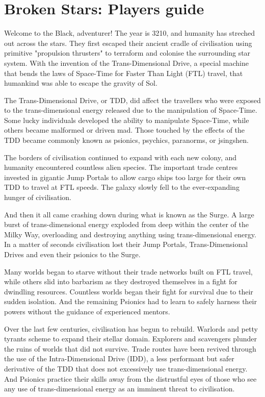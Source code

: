 \documentclass[10pt,twoside]{article}
\begin{document}
\section*{Broken Stars: Players guide}
\addtocounter{section}{1}

Welcome to the Black, adventurer! The year is 3210, and humanity has streched out across the stars. They first escaped their ancient cradle of civilisation using primitive "propulsion thrusters" to terraform and colonise the surrounding star system. With the invention of the Trans-Dimensional Drive, a special machine that bends the laws of Space-Time for Faster Than Light (FTL) travel, that humankind was able to escape the gravity of Sol.

The Trans-Dimensional Drive, or TDD, did affect the travellers who were exposed to the trans-dimensional energy released due to the manipulation of Space-Time. Some lucky individuals developed the ability to manipulate Space-Time, while others became malformed or driven mad. Those touched by the effects of the TDD became commonly known as psionics, psychics, paranorms, or jsingshen.

The borders of civilisation continued to expand with each new colony, and humanity encountered countless alien species. The important trade centres invested in gigantic Jump Portals to allow cargo ships too large for their own TDD to travel at FTL speeds. The galaxy slowly fell to the ever-expanding hunger of civilisation.

And then it all came crashing down during what is known as the Surge. A large burst of trans-dimensional energy exploded from deep within the center of the Milky Way, overloading and destroying anything using trans-dimensional energy. In a matter of seconds civilisation lost their Jump Portals, Trans-Dimensional Drives and even their psionics to the Surge.

Many worlds began to starve without their trade networks built on FTL travel, while others slid into barbarism as they destroyed themselves in a fight for dwindling resources. Countless worlds began their fight for survival due to their sudden isolation. And the remaining Psionics had to learn to safely harness their powers without the guidance of experienced mentors.

Over the last few centuries, civilisation has begun to rebuild. Warlords and petty tyrants scheme to expand their stellar domain. Explorers and scavengers plunder the ruins of worlds that did not survive. Trade routes have been revived through the use of the  Intra-Dimensional Drive (IDD), a less performant but safer derivative of the TDD that does not excessively use trans-dimensional energy. And Psionics practice their skills away from the distrustful eyes of those who see any use of trans-dimensional energy as an imminent threat to civilisation.
\end{document}
